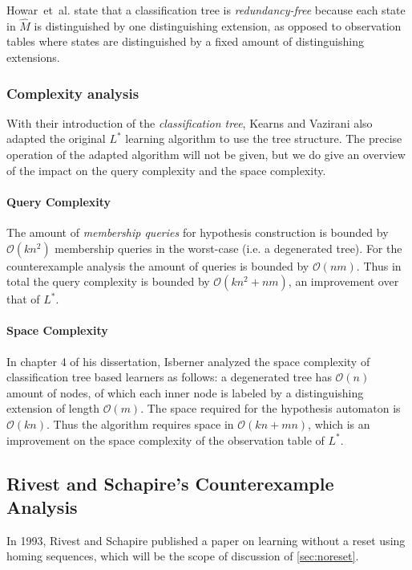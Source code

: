 \documentclass[multi,crop=false,class=article]{standalone}
\begin{document}
Howar~et~al. state that a classification tree is \textit{redundancy-free}
because each state in $\hat M$ is distinguished by one distinguishing extension,
as opposed to observation tables where states are distinguished by a fixed
amount of distinguishing extensions\cite{Howar2014}.

\subsubsection{Complexity analysis}
\label{sec:complexity-analysis}
With their introduction of the \textit{classification tree}, Kearns and Vazirani
also adapted the original $L^*$ learning algorithm to use the tree
structure\cite{Kearns1994}. The precise operation of the adapted algorithm will
not be given, but we do give an overview of the impact on the query complexity
and the space complexity.

\paragraph{Query Complexity} The amount of \textit{membership queries} for
hypothesis construction is bounded by $\mathcal{O}(kn^2)$ membership queries in
the worst-case (i.e. a degenerated
tree)\cite{Howar2014,Kearns1994,Isberner2014b}. For the counterexample analysis
the amount of queries is bounded by $\mathcal{O}(nm)$\cite{Kearns1994}. Thus in
total the query complexity is bounded by $\mathcal{O}(kn^2 + nm)$, an
improvement over that of $L^*$.

\paragraph{Space Complexity} In chapter 4 of his dissertation, Isberner analyzed
the space complexity of classification tree based learners as follows: a
degenerated tree has $\mathcal{O}(n)$ amount of nodes, of which each inner node
is labeled by a distinguishing extension of length
$\mathcal{O}(m)$\cite{Isberner2015a}.  The space required for the hypothesis
automaton is $\mathcal{O}(kn)$\cite{Isberner2015a}. Thus the algorithm requires
space in $\mathcal{O}(kn + mn)$\cite{Isberner2014b,Isberner2015a}, which is an
improvement on the space complexity of the observation table of $L^*$.

\subsection{Rivest and Schapire's Counterexample Analysis}
\label{sec:rivest-schap-count}
In 1993, Rivest and Schapire published a paper on learning without a reset using
homing sequences\cite{Rivest1993}, which will be the scope of discussion of
\cref{sec:noreset}.
\end{document}
